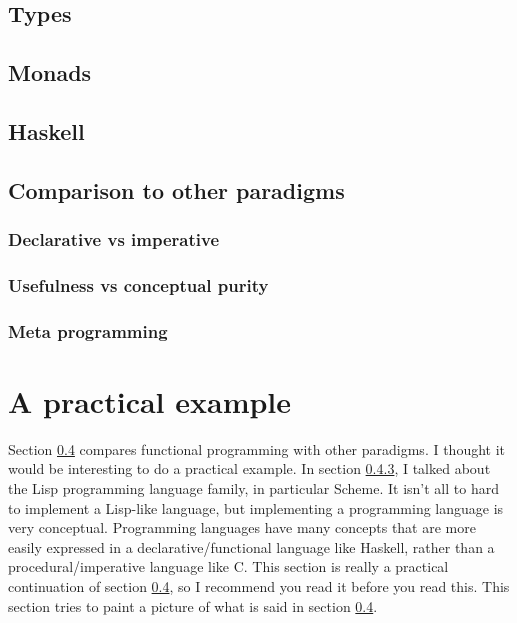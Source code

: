 \documentclass[11pt]{article}
\begin{document}
\subsection{Types}

\subsection{Monads}

\subsection{Haskell}\label{haskell}

\subsection{Comparison to other paradigms}\label{comparison}

\subsubsection{Declarative vs imperative}

\subsubsection{Usefulness vs conceptual purity}

\subsubsection{Meta programming}\label{metaprogramming}

\section{A practical example}

Section \ref{comparison} compares functional programming with other paradigms.
I thought it would be interesting to do a practical example. In section
\ref{metaprogramming}, I talked about the Lisp programming language family, in
particular Scheme. It isn't all to hard to implement a Lisp-like language, but
implementing a programming language is very conceptual. Programming languages
have many concepts that are more easily expressed in a declarative/functional
language like Haskell, rather than a procedural/imperative language like C.
This section is really a practical continuation of section \ref{comparison}, so
I recommend you read it before you read this. This section tries to paint a
picture of what is said in section \ref{comparison}.
\end{document}
